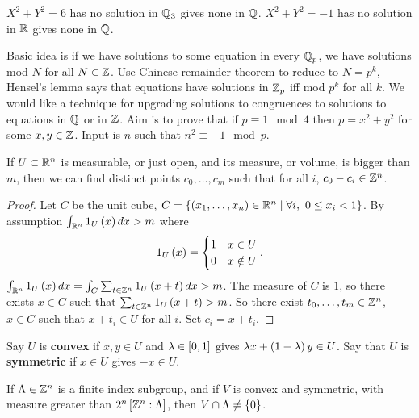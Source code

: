 \begin{example*}
$ X^2 + Y^2 = 6 $ has no solution in $ \Q_3 $ gives none in $ \Q $. $ X^2 + Y^2 = -1 $ has no solution in $ \R $ gives none in $ \Q $.
\end{example*}

Basic idea is if we have solutions to some equation in every $ \Q_p $, we have solutions mod $ N $ for all $ N \in \Z $. Use Chinese remainder theorem to reduce to $ N = p^k $, Hensel's lemma says that equations have solutions in $ \Z_p $ iff mod $ p^k $ for all $ k $. We would like a technique for upgrading solutions to congruences to solutions to equations in $ \Q $ or in $ \Z $. Aim is to prove that if $ p \equiv 1 \mod 4 $ then $ p = x^2 + y^2 $ for some $ x, y \in \Z $. Input is $ n $ such that $ n^2 \equiv -1 \mod p $.

\begin{lemma}
\label{lem:4.1}
If $ U \subset \R^n $ is measurable, or just open, and its measure, or volume, is bigger than $ m $, then we can find distinct points $ c_0, \dots, c_m $ such that for all $ i $, $ c_0 - c_i \in \Z^n $.
\end{lemma}

\begin{proof}
Let $ C $ be the unit cube, $ C = \cb{\rb{x_1, \dots, x_n} \in \R^n \mid \forall i, \ 0 \le x_i < 1} $. By assumption $ \int_{\R^n} 1_U\rb{x} dx > m $ where
$$ 1_U\rb{x} =
\begin{cases}
1 & x \in U \\
0 & x \notin U
\end{cases}.
$$
$ \int_{\R^n} 1_U\rb{x} dx = \int_C \sum_{t \in \Z^n} 1_U\rb{x + t}dx > m $. The measure of $ C $ is $ 1 $, so there exists $ x \in C $ such that $ \sum_{t \in \Z^n} 1_U\rb{x + t} > m $. So there exist $ t_0, \dots, t_m \in \Z^n $, $ x \in C $ such that $ x + t_i \in U $ for all $ i $. Set $ c_i = x + t_i $.
\end{proof}

\begin{definition}
Say $ U $ is \textbf{convex} if $ x, y \in U $ and $ \lambda \in \sb{0, 1} $ gives $ \lambda x + \rb{1 - \lambda}y \in U $. Say that $ U $ is \textbf{symmetric} if $ x \in U $ gives $ -x \in U $.
\end{definition}

\begin{corollary}[Minkowski]
\label{cor:4.3}
If $ \Lambda \in \Z^n $ is a finite index subgroup, and if $ V $ is convex and symmetric, with measure greater than $ 2^n\sb{\Z^n : \Lambda} $, then $ V \cap \Lambda \ne \cb{0} $.
\end{corollary}

